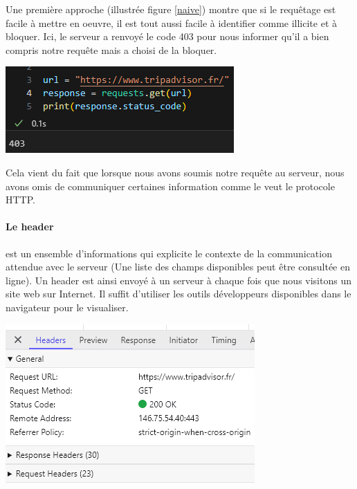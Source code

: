 Une première approche (illustrée figure \ref{naive}) montre que si le requêtage est facile à mettre en oeuvre, il est tout aussi facile à identifier comme illicite et à bloquer. Ici, le serveur a renvoyé le code 403 pour nous informer qu'il a bien compris notre requête mais a choisi de la bloquer.

\begin{center}
\includegraphics[scale=0.8]{Images/naive.png}
\label{naive}
\end{center}

Cela vient du fait que lorsque nous avons soumis notre requête au serveur, nous avons omis de communiquer certaines information comme le veut le protocole HTTP.
\paragraph*{Le header} est un ensemble d'informations qui explicite le contexte de la communication attendue avec le serveur (Une liste des champs disponibles peut être consultée en ligne\cite{HTTPHeadersHTTP2024}). Un header est ainsi envoyé à un serveur à chaque fois que nous visitons un site web sur Internet. Il suffit d'utiliser les outils développeurs disponibles dans le navigateur pour le visualiser. 

\begin{center}
\includegraphics[scale=0.8]{Images/header.png}
\label{header_Brave}
\end{center}

